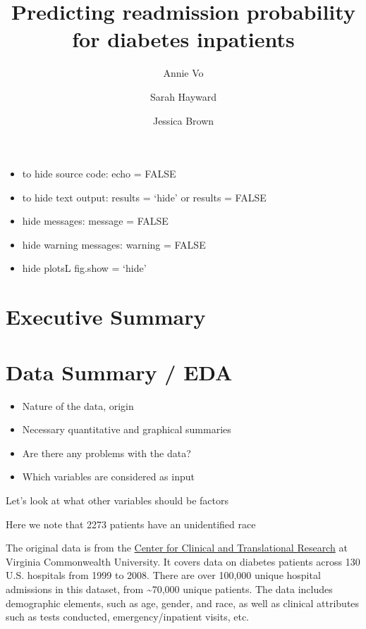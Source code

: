 \documentclass[
]{article}
\title{Predicting readmission probability for diabetes inpatients}
\author{Annie Vo \and Sarah Hayward \and Jessica Brown}
\date{}
\providecommand{\tightlist}{%
  \setlength{\itemsep}{0pt}\setlength{\parskip}{0pt}}
\begin{document}
\maketitle

{
\hypersetup{linkcolor=}
\setcounter{tocdepth}{4}
\tableofcontents
}
\begin{itemize}
\tightlist
\item
  to hide source code: echo = FALSE
\item
  to hide text output: results = `hide' or results = FALSE
\item
  hide messages: message = FALSE
\item
  hide warning messages: warning = FALSE
\item
  hide plotsL fig.show = `hide'
\end{itemize}

\hypertarget{executive-summary}{%
\section{Executive Summary}\label{executive-summary}}

\hypertarget{data-summary-eda}{%
\section{Data Summary / EDA}\label{data-summary-eda}}

\begin{itemize}
\tightlist
\item
  Nature of the data, origin
\item
  Necessary quantitative and graphical summaries
\item
  Are there any problems with the data?
\item
  Which variables are considered as input
\end{itemize}

Let's look at what other variables should be factors

Here we note that 2273 patients have an unidentified race

The original data is from the
\href{https://archive.ics.uci.edu/ml/datasets/Diabetes+130-US+hospitals+for+years+1999-2008}{Center
for Clinical and Translational Research} at Virginia Commonwealth
University. It covers data on diabetes patients across 130 U.S.
hospitals from 1999 to 2008. There are over 100,000 unique hospital
admissions in this dataset, from \textasciitilde70,000 unique patients.
The data includes demographic elements, such as age, gender, and race,
as well as clinical attributes such as tests conducted,
emergency/inpatient visits, etc.
\end{document}
